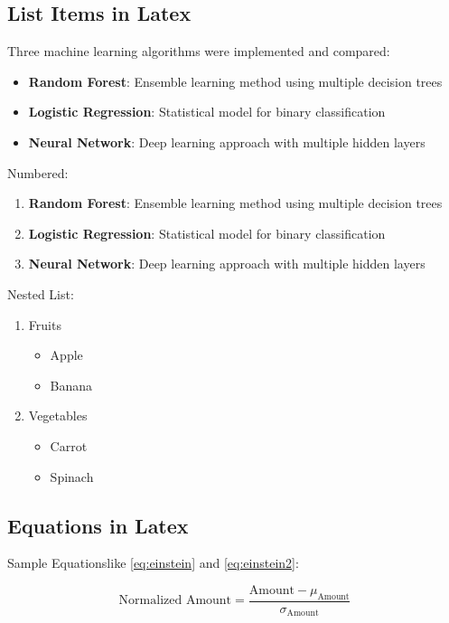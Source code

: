 \subsection{List Items in Latex}

Three machine learning algorithms were implemented and compared:

\begin{itemize}
\item \textbf{Random Forest}: Ensemble learning method using multiple decision trees
\item \textbf{Logistic Regression}: Statistical model for binary classification
\item \textbf{Neural Network}: Deep learning approach with multiple hidden layers
\end{itemize}

Numbered:

\begin{enumerate}
	\item \textbf{Random Forest}: Ensemble learning method using multiple decision trees
	\item \textbf{Logistic Regression}: Statistical model for binary classification
	\item \textbf{Neural Network}: Deep learning approach with multiple hidden layers
\end{enumerate}

Nested List:

\begin{enumerate}
	\item Fruits
	\begin{itemize}
		\item Apple
		\item Banana
	\end{itemize}
	\item Vegetables
	\begin{itemize}
		\item Carrot
		\item Spinach
	\end{itemize}
\end{enumerate}


\subsection{Equations in Latex}

Sample Equationslike \eqref{eq:einstein} and \eqref{eq:einstein2}:

\begin{equation}
\text{Normalized Amount} = \frac{\text{Amount} - \mu_{\text{Amount}}}{\sigma_{\text{Amount}}}
\label{eq:einstein}
\end{equation}

